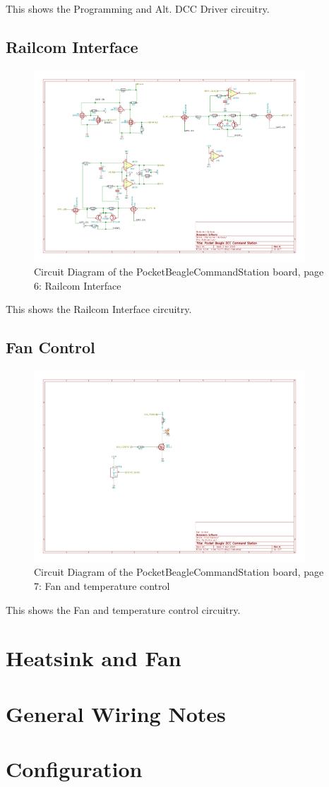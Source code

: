 This shows the Programming and Alt. DCC Driver circuitry.
\clearpage
\subsection{Railcom Interface}
\begin{figure}[hbpt]\begin{centering}%
\includegraphics[width=4in]{PocketBeagleCommandStation-6.pdf}
\caption{Circuit Diagram of the PocketBeagleCommandStation board, page 6: 
Railcom Interface}
\end{centering}\end{figure}

This shows the Railcom Interface circuitry.
\clearpage
\subsection{Fan Control}
\begin{figure}[hbpt]\begin{centering}%
\includegraphics[width=4in]{PocketBeagleCommandStation-7.pdf}
\caption{Circuit Diagram of the PocketBeagleCommandStation board, page 7: 
Fan and temperature control}
\end{centering}\end{figure}

This shows the Fan and temperature control circuitry.
\clearpage
\section{Heatsink and Fan}

\section{General Wiring Notes}

\section{Configuration}




